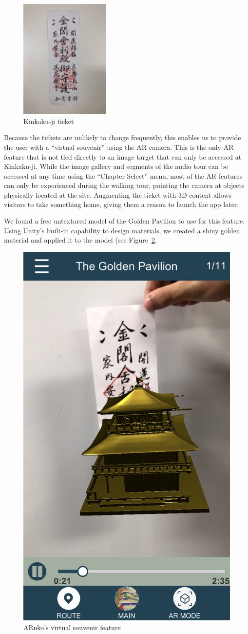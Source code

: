 \documentclass[a4paper, 10pt, american, titlepage]{article}
\begin{document}
\begin{figure}[h] \centering
    \includegraphics[width=0.4\textwidth]{kinkakuji-ticket.jpeg}
    \caption{Kinkaku-ji ticket}
    \label{fig:kinkakujiTicket}
\end{figure}

Because the tickets are unlikely to change frequently, this enables us to
provide the user with a ``virtual souvenir'' using the AR camera. This is the
only AR feature that is not tied directly to an image target that can only be
accessed at Kinkaku-ji. While the image gallery and segments of the audio tour
can be accessed at any time using the ``Chapter Select'' menu, most of the AR
features can only be experienced during the walking tour, pointing the camera at
objects physically located at the site. Augmenting the ticket with 3D content
allows visitors to take something home, giving them a reason to launch the app
later.

We found a free untextured model of the Golden Pavilion to use for this
feature. Using Unity's built-in capability to design materials, we created
a shiny golden material and applied it to the model (see
Figure~\ref{fig:souvenir}.

\begin{figure}[h]
	\centering
	\includegraphics[width=.5\textwidth]{souvenir.png}
	\caption{ARuko's virtual souvenir feature}
	\label{fig:souvenir}
\end{figure}
\end{document}
